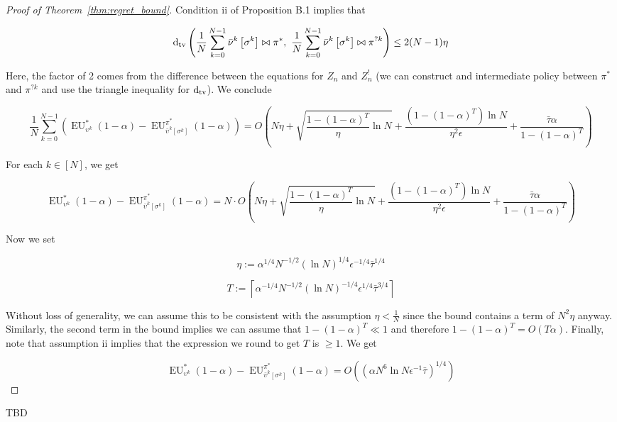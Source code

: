 \documentclass[anon,12pt]{colt2018} %
\newcommand{\AP}[1]{\left(#1\right)}
\newcommand{\AB}[1]{\left[#1\right]}
\newcommand{\Dtv}{\operatorname{d}_{\textnormal{tv}}}
\newcommand{\Ceil}[1]{\left\lceil #1 \right\rceil}
\newcommand{\EU}{\operatorname{EU}}
\begin{document}
\begin{proof}[Proof of Theorem~\ref{thm:regret_bound}]
Condition ii of Proposition B.1 implies that

$$\Dtv\left(\frac{1}{N}\sum_{k=0}^{N-1}{\bar{\nu}^k\left[\sigma^k\right]\bowtie\pi^*},\ \frac{1}{N}\sum_{k=0}^{N-1}{\bar{\nu}^k\left[\sigma^k\right]\bowtie\pi^{?k}}\right) \leq 2(N-1)\eta$$

Here, the factor of 2 comes from the difference between the equations for $Z_n$ and $Z^!_n$ (we can construct and intermediate policy between $\pi^*$ and $\pi^{?k}$ and use the triangle inequality for $\Dtv$). We conclude

$$\frac{1}{N}\sum_{k=0}^{N-1}\AP{\EU^{*}_{\upsilon^k}(1-\alpha)-\EU^{\pi^{*}}_{\bar{\upsilon}^k\AB{\sigma^k}}(1-\alpha)} = O\left(N\eta +\sqrt{\frac{1-(1-\alpha)^T}{\eta}\ln N}  +\frac{\AP{1-(1-\alpha)^T}\ln N}{\eta^2\epsilon}+\frac{\bar{\tau}\alpha}{1-(1-\alpha)^T}\right)$$

For each $k \in [N]$, we get

$$\EU^{*}_{\upsilon^k}(1-\alpha)-\EU^{\pi^{*}}_{\bar{\upsilon}^k\AB{\sigma^k}}(1-\alpha) = N \cdot O\left(N\eta +\sqrt{\frac{1-(1-\alpha)^T}{\eta}\ln N}  +\frac{\AP{1-(1-\alpha)^T}\ln N}{\eta^2\epsilon}+\frac{\bar{\tau}\alpha}{1-(1-\alpha)^T}\right)$$

Now we set 

$$\eta:=\alpha^{1/4} N^{-1/2} \AP{\ln N}^{1/4} \epsilon^{-1/4} \bar{\tau}^{1/4}$$  

$$T:=\Ceil{\alpha^{-1/4}N^{-1/2} \AP{\ln N}^{-1/4} \epsilon^{1/4} \bar{\tau}^{3/4}}$$

Without loss of generality, we can assume this to be consistent with the assumption $\eta < \frac{1}{N}$ since the bound contains a term of $N^2\eta$ anyway. Similarly, the second term in the bound implies we can assume that $1 - (1-\alpha)^T \ll 1$ and therefore $1 - (1-\alpha)^T = O(T\alpha)$. Finally, note that assumption ii implies that the expression we round to get $T$ is $\geq 1$. We get

$$\EU^{*}_{\upsilon^k}(1-\alpha)-\EU^{\pi^{*}}_{\bar{\upsilon}^k\AB{\sigma^k}}(1-\alpha) = O\AP{\AP{\alpha N^6 \ln{N} \epsilon^{-1} \bar{\tau}}^{1/4}}$$
\end{proof}

TBD
\end{document}
